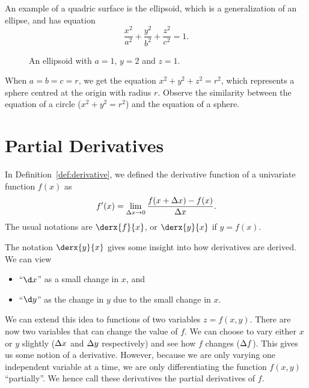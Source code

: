 An example of a quadric surface is the ellipsoid, which is a generalization of an ellipse, and has equation \[\frac{x^2}{a^2} + \frac{y^2}{b^2} + \frac{z^2}{c^2} = 1.\]

\begin{figure}[H]
    \centering
    \caption{An ellipsoid with $a = 1$, $y = 2$ and $z = 1$.}
\end{figure}

When $a = b = c = r$, we get the equation $x^2 + y^2 + z^2 = r^2$, which represents a sphere centred at the origin with radius $r$. Observe the similarity between the equation of a circle ($x^2 + y^2 = r^2$) and the equation of a sphere.

\section{Partial Derivatives}

In Definition~\ref{def:derivative}, we defined the derivative function of a univariate function $f(x)$ as \[f'(x) = \lim_{\Delta x \to 0} \frac{f(x + \Delta x) - f(x)}{\Delta x}.\] The usual notations are $\derx{f}{x}$, or $\derx{y}{x}$ if $y = f(x)$.

The notation $\derx{y}{x}$ gives some insight into how derivatives are derived. We can view
\begin{itemize}
    \item ``$\d x$'' as a small change in $x$, and
    \item ``$\d y$'' as the change in $y$ due to the small change in $x$.
\end{itemize}

We can extend this idea to functions of two variables $z = f(x, y)$. There are now two variables that can change the value of $f$. We can choose to vary either $x$ or $y$ slightly ($\Delta x$ and $\Delta y$ respectively) and see how $f$ changes ($\Delta f$). This gives us some notion of a derivative. However, because we are only varying one independent variable at a time, we are only differentiating the function $f(x,y)$ ``partially''. We hence call these derivatives the partial derivatives of $f$.

